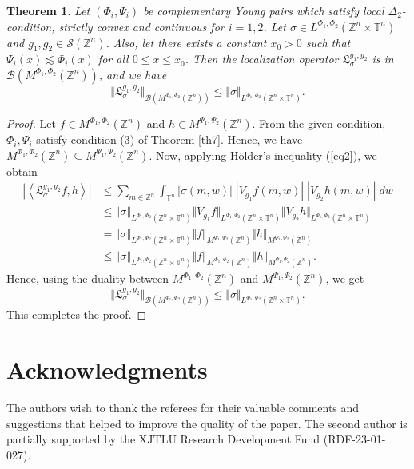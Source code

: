 \documentclass[a4paper,11pt, reqno]{amsart}
\theoremstyle{plain}
\newtheorem{theorem}{Theorem}[section]
\theoremstyle{definition}
\theoremstyle{remark}
\def \Z{{\mathbb Z}}
\def \T{{\mathbb T}}
\begin{document}
\begin{theorem}
Let $\left(\Phi_i, \Psi_i \right)$ be complementary Young pairs which satisfy local $\Delta_2$-condition, strictly convex and continuous for $i = 1, 2$. Let $\sigma \in L^{\Phi_1, \Phi_2} (\Z^n \times \T^n)$ and $g_1, g_2 \in \mathcal{S}(\Z^n)$. Also, let there exists a constant $x_0 > 0$ such that $\Psi_i(x) \lesssim \Phi_i(x)$ for all $0 \leq x \leq x_0$. Then the localization operator $ \mathfrak{L}^{g_1, g_2}_{\sigma}$ is in $\mathcal{B}(M^{\Phi_1, \Phi_2}(\Z^n))$, and we have 
\[ \Vert \mathfrak{L}^{g_1, g_2}_{\sigma} \Vert_{\mathcal{B}(M^{\Phi_1, \Phi_2}(\Z^n))} \leq \Vert \sigma \Vert_{L^{\Phi_1, \Phi_2} (\Z^n \times \T^n)} . \]
\end{theorem}
\begin{proof}
Let $f \in M^{\Phi_1, \Phi_2}(\Z^n)$ and $h \in M^{\Psi_1, \Psi_2}(\Z^n)$. From the given condition, $\Phi_i, \Psi_i$ satisfy condition (3) of Theorem \ref{th7}. Hence, we have $M^{\Phi_1, \Phi_2}(\Z^n) \subseteq M^{\Psi_1, \Psi_2}(\Z^n)$. Now, applying H\"older's inequality (\ref{eq2}), we obtain
\begin{align*}
\left| \left\langle \mathfrak{L}^{g_1, g_2}_{\sigma}f, h \right\rangle \right| 
& \leq \sum_{m \in \Z^n}  \int_{\T^n} |\sigma(m, w)| \; \left|V_{g_1}f(m, w) \right| \; \left| V_{g_2}h(m, w) \right| \; dw  \\ 
& \leq \left\Vert \sigma \right\Vert_{L^{\Phi_1, \Phi_2} (\Z^n \times \T^n)} \Vert V_{g_1}f \Vert_{L^{\Psi_1, \Psi_2} (\Z^n \times \T^n)}   \Vert V_{g_2}h \Vert_{L^{\Psi_1, \Psi_2} (\Z^n \times \T^n)} \\
& = \left\Vert \sigma \right\Vert_{L^{\Phi_1, \Phi_2} (\Z^n \times \T^n)} \Vert  f \Vert_{M^{\Psi_1, \Psi_2}(\Z^n)}   \Vert  h \Vert_{M^{\Psi_1, \Psi_2}(\Z^n)} \\
& \leq \left\Vert \sigma \right\Vert_{L^{\Phi_1, \Phi_2} (\Z^n \times \T^n)} \Vert  f \Vert_{M^{\Phi_1, \Phi_2}(\Z^n)}   \Vert  h \Vert_{M^{\Psi_1, \Psi_2}(\Z^n)}. 
\end{align*}
Hence, using the duality between $M^{\Phi_1, \Phi_2}(\Z^n)$ and $M^{\Psi_1, \Psi_2}(\Z^n)$, we get
\[ \Vert \mathfrak{L}^{g_1, g_2}_{\sigma} \Vert_{\mathcal{B}(M^{\Phi_1, \Phi_2}(\Z^n))} \leq \Vert \sigma \Vert_{L^{\Phi_1, \Phi_2} (\Z^n \times \T^n)}. \]
This completes the proof.
\end{proof}

\section*{Acknowledgments}
The authors wish to thank the referees for their valuable comments and suggestions that helped to improve the quality of the paper. The second author is partially supported by the XJTLU Research Development Fund (RDF-23-01-027).
\end{document}

